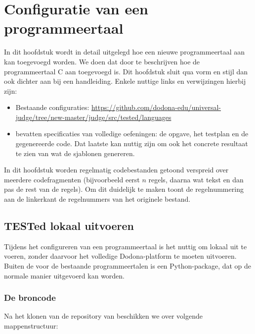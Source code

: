 \chapter{Configuratie van een programmeertaal}\label{ch:nieuwe-taal}

In dit hoofdstuk wordt in detail uitgelegd hoe een nieuwe programmeertaal aan \tested{} kan toegevoegd worden.
We doen dat door te beschrijven hoe de programmeertaal C aan \tested{} toegevoegd is.
Dit hoofdstuk sluit qua vorm en stijl dan ook dichter aan bij een handleiding.
Enkele nuttige links en verwijzingen hierbij zijn:

\begin{itemize}
    \item Bestaande configuraties: \url{https://github.com/dodona-edu/universal-judge/tree/new-master/judge/src/tested/languages}
    \item {} bevatten specificaties van volledige oefeningen: de opgave, het testplan en de gegenereerde code.
    Dat laatste kan nuttig zijn om ook het concrete resultaat te zien van wat de sjablonen genereren.
\end{itemize}

In dit hoofdstuk worden regelmatig codebestanden getoond verspreid over meerdere codefragmenten (bijvoorbeeld eerst $n$ regels, daarna wat tekst en dan pas de rest van de regels).
Om dit duidelijk te maken toont de regelnummering aan de linkerkant de regelnummers van het originele bestand. 

\section{TESTed lokaal uitvoeren}\label{sec:tested-lokaal-uitvoeren}

Tijdens het configureren van een programmeertaal is het nuttig om \tested{} lokaal uit te voeren, zonder daarvoor het volledige Dodona-platform te moeten uitvoeren.
Buiten de  voor de bestaande programmeertalen is \tested{} een Python-package, dat op de normale manier uitgevoerd kan worden.

\subsection{De broncode}\label{subsec:de-broncode}

Na het klonen van de repository van \tested{} beschikken we over volgende mappenstructuur:

